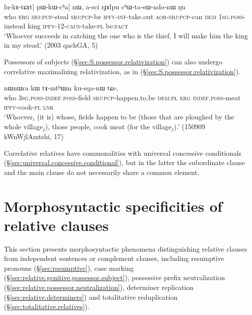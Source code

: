 \begin{exe}
\ex \label{ex:CW.kW.kWmWrkW}
\gll  [[\textbf{ɕɯ} kɯ [kɯ-mɯrkɯ kɯ-ŋu] lu-kɤ-tɕɤt] pɯ-kɯ-cʰa] nɯ, a-sci rɟɤlpu cʰɯ-ta-sɯ-ndo-nɯ ŋu \\
who \textsc{erg} \textsc{sbj}:\textsc{pcp}-steal  \textsc{sbj}:\textsc{pcp}-be \textsc{ipfv}-\textsc{inf}-take.out \textsc{aor}-\textsc{sbj}:\textsc{pcp}-can \textsc{dem} \textsc{1sg}.\textsc{poss}-instead king \textsc{ipfv}-1\fl{}2-\textsc{caus}-take-\textsc{pl} be:\textsc{fact} \\
\glt `Whoever succeeds in catching the one who is the thief, I will make him the king in my stead.' (2003 qachGA, 5)
\end{exe}

Possessors of subjects (§\ref{sec:S.possessor.relativization}) can also undergo correlative maximalizing relativization, as in (§\ref{sec:S.possessor.relativization}).

\begin{exe}
\ex \label{ex:WtWji.kWnAtWG}
 nɯnɯra kɯ tɤ-mtʰɯm ku-sqa-nɯ tɕe, \\
who \textsc{3sg}.\textsc{poss}-\textsc{indef}.\textsc{poss}-field \textsc{sbj}:\textsc{pcp}-happen.to.be \textsc{dem}:\textsc{pl} \textsc{erg} \textsc{indef}.\textsc{poss}-meat \textsc{ipfv}-cook-\textsc{pl} \textsc{lnk} \\
\glt `Whoever$_i$ (it is) whose$_i$ fields happen to be (those that are ploughed by the whole village$_j$), those people$_i$ cook meat (for the village$_j$).' (150909 kWnWjlAmtshi, 17)
\end{exe}

Correlative relatives have commonalities with universal concessive conditionals (§\ref{sec:universal.concessive.conditional}), but in the latter the subordinate clause and the main clause do not necessarily share a common element.

\section{Morphosyntactic specificities of relative clauses} \label{sec:relative.morphosyntactic.specificities}
This section presents morphosyntactic phenomena distinguishing relative clauses from independent sentences or complement clauses, including resumptive pronouns (§\ref{sec:resumptive}), case marking (§\ref{sec:relative.genitive.possessor.subject}), possessive prefix neutralization (§\ref{sec:relative.possessor.neutralization}), determiner replication (§\ref{sec:relative.determiners}) and totalitative reduplication (§\ref{sec:totalitative.relatives}).

